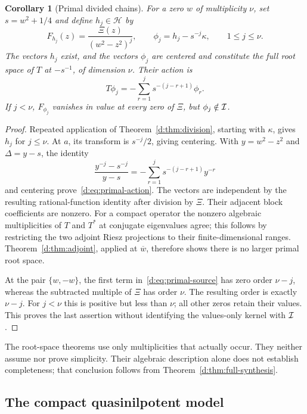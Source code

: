 \documentclass[11pt,a4paper]{article}
\numberwithin{equation}{section}
\newtheorem{corollary}[theorem]{Corollary}
\theoremstyle{definition}\newtheorem{definition}[theorem]{Definition}
\theoremstyle{remark}\newtheorem{remark}[theorem]{Remark}
\newcommand{\Hh}{\mathcal H}\newcommand{\Hw}{\mathcal H}
\begin{document}
\begin{corollary}[Primal divided chains]\label{d:cor:primal}
For a zero $w$ of multiplicity $\nu$, set $s=w^2+1/4$ and define $h_j\in\Hh$ by
\begin{equation}\label{d:eq:primal-source}
 F_{h_j}(z)=\frac{\Xi(z)}{(w^2-z^2)^j},\qquad
 \phi_j=h_j-s^{-j}\kappa,\qquad 1\le j\le\nu.
\end{equation}
The vectors $h_j$ exist, and the vectors $\phi_j$ are centered and constitute the full root space of $T$ at $-s^{-1}$, of dimension $\nu$. Their action is
\begin{equation}\label{d:eq:primal-action}
 T\phi_j=-\sum_{r=1}^j s^{-(j-r+1)}\phi_r.
\end{equation}
If $j<\nu$, $F_{\phi_j}$ vanishes in value at every zero of $\Xi$, but $\phi_j\notin\mathcal I$.
\end{corollary}
\begin{proof}
Repeated application of Theorem~\ref{d:thm:division}, starting with $\kappa$, gives $h_j$ for $j\le\nu$. At $a$, its transform is $s^{-j}/2$, giving centering. With $y=w^2-z^2$ and $\Delta=y-s$, the identity
\[
 \frac{y^{-j}-s^{-j}}{y-s}
 =-\sum_{r=1}^j s^{-(j-r+1)}y^{-r}
\]
and centering prove~\eqref{d:eq:primal-action}. The vectors are independent by the resulting rational-function identity after division by $\Xi$. Their adjacent block coefficients are nonzero. For a compact operator the nonzero algebraic multiplicities of $T$ and $T^*$ at conjugate eigenvalues agree; this follows by restricting the two adjoint Riesz projections to their finite-dimensional ranges. Theorem~\ref{d:thm:adjoint}, applied at $\overline w$, therefore shows there is no larger primal root space.

At the pair $\{w,-w\}$, the first term in~\eqref{d:eq:primal-source} has zero order $\nu-j$, whereas the subtracted multiple of $\Xi$ has order $\nu$. The resulting order is exactly $\nu-j$. For $j<\nu$ this is positive but less than $\nu$; all other zeros retain their values. This proves the last assertion without identifying the values-only kernel with $\mathcal I$.
\end{proof}

The root-space theorems use only multiplicities that actually occur. They neither assume nor prove simplicity. Their algebraic description alone does not establish completeness; that conclusion follows from Theorem~\ref{d:thm:full-synthesis}.

\subsection{The compact quasinilpotent model}\label{d:sec:gap}
\end{document}
